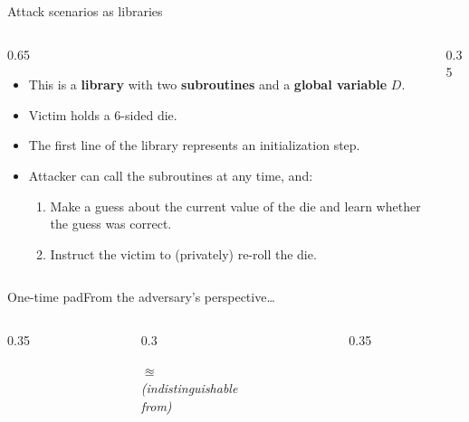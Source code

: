 \ifdefined\PRESENTATION\else\PassOptionsToClass{handout}{beamer}\fi\documentclass[aspectratio=169, lualatex]{beamer}
\begin{document}
\begin{frame}{Attack scenarios as libraries}
	\begin{columns}[c]
		\begin{column}{0.65\textwidth}
			\begin{itemize}
				\item This is a \textbf{library} with two \textbf{subroutines} and a \textbf{global variable} $D$.
				\item Victim holds a 6-sided die.
				\item The first line of the library represents an initialization step.
				\item Attacker can call the subroutines at any time, and:
				      \begin{enumerate}
					      \item Make a guess about the current value of the die and learn whether the guess was correct.
					      \item Instruct the victim to (privately) re-roll the die.
				      \end{enumerate}
			\end{itemize}
		\end{column}
		\begin{column}{0.35\textwidth}
			\vspace{-1cm}
			\begin{center}
			\end{center}
		\end{column}
	\end{columns}
\end{frame}

\begin{frame}{One-time pad}{From the adversary's perspective\ldots}
	\begin{columns}[c]
		\begin{column}{0.35\textwidth}
		\end{column}
		\begin{column}{0.3\textwidth}
			\begin{center}
				{\huge{$\approxeq$}} \\[1em]
				{\scriptsize\textit{(indistinguishable \\ from)}}
			\end{center}
		\end{column}
		\begin{column}{0.35\textwidth}
		\end{column}
	\end{columns}
\end{frame}
\end{document}
